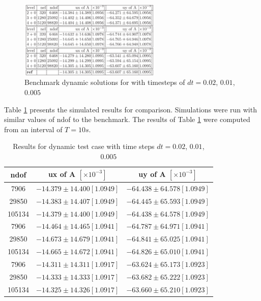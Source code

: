 \documentclass{article}
\begin{document}
\FloatBarrier
\begin{figure}[h]
\centering
	\includegraphics[width=0.6\textwidth]{CSM_3_data}
	\caption{Benchmark dynamic solutions for with timesteps of $dt = 0.02$, $0.01$, $0.005$ \cite{turek2006proposal}}
	\label{fig:CSM_3}
\end{figure}

Table \ref{tab:struct} presents the simulated results for comparison. Simulations were run with similar values of ndof to the benchmark. The results of Table \ref{tab:struct} were computed from an interval of $T = 10 s$. 

\FloatBarrier
  \begin{table}[htbp]
  \setlength\extrarowheight{5pt}
  \centering
  \caption{Results for dynamic test case with time steps $dt = 0.02$, $0.01$, $0.005$}
    \begin{tabular}{ccc}
    \toprule
     ndof & ux of A $[\times 10^{-3}]$ & uy of A $[\times 10^{-3}]$ \\
    \midrule
7906 & $-14.379 \pm 14.400 [1.0949]$ & $-64.438 \pm 64.578[1.0949] $\\
29850 & $-14.383 \pm 14.407 [1.0949] $ & $-64.445 \pm 65.593 [1.0949] $\\
105134 & $-14.379 \pm 14.400[1.0949]  $ & $-64.438 \pm 64.578[1.0949]  $\\
    \midrule
7906 & $-14.464 \pm 14.465 [1.0941] $ & $-64.787\pm 64.971 [1.0941]$\\
29850 & $-14.673 \pm 14.679 [1.0941]$ & $-64.841 \pm 65.025 [1.0941]$\\
105134 & $-14.665 \pm 14.672 [1.0941] $ & $-64.826 \pm 65.010 [1.0941] $\\
    \midrule
7906 & $-14.311 \pm 14.311 [1.0917]$ & $-63.624 \pm 65.173 [1.0923]$\\
29850 & $-14.333 \pm 14.333 [1.0917]$ & $-63.682 \pm 65.222 [1.0923] $\\
105134 & $-14.325 \pm 14.326 [1.0917]$ & $-63.660 \pm 65.210 [1.0923]$\\
    \bottomrule
    \end{tabular}%
  \label{tab:struct}%
\end{table}%
\FloatBarrier
\end{document}
